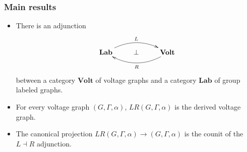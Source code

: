 \documentclass{beamer}
\newcommand{\isleftadjoint}{\dashv}
\newcommand{\Volt}{\mathbf{Volt}}
\newcommand{\Lab}{\mathbf{Lab}}
\begin{document}
\begin{frame}
\frametitle{Main results}
\begin{itemize}
\item
There is an adjunction
$$
\xymatrix{
\Lab
	\ar@/^1.2pc/[rr]^-L
&
\bot
&
\Volt
	\ar@/^1.2pc/[ll]^-R
}
$$
between a category  $\Volt$ of voltage graphs and a
category $\Lab$ of group labeled graphs. 
\item For every voltage graph $(G,Γ,α)$,
$LR(G,Γ,α)$ is the derived voltage graph.
\item
The canonical projection
$LR(G,Γ,α)\to(G,Γ,α)$ is the counit of the $L\isleftadjoint R$ adjunction.
\end{itemize}
\end{frame}
\end{document}
